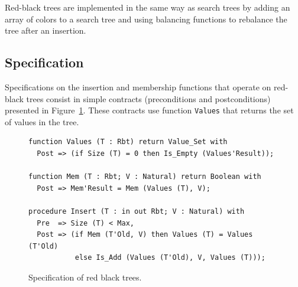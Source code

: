\documentclass{llncs}
\begin{document}
Red-black trees are implemented in the same way as search trees by adding an
array of colors to a search tree and using balancing functions to rebalance the
tree after an insertion.

\subsection{Specification}

Specifications on the insertion and membership functions that operate on
red-black trees consist in simple contracts (preconditions and postconditions)
presented in Figure~\ref{fig-rbt-spec}. These contracts use function
\texttt{Values} that returns the set of values in the tree.


\begin{figure}[ht]
\begin{small}
\begin{lstlisting}
function Values (T : Rbt) return Value_Set with
  Post => (if Size (T) = 0 then Is_Empty (Values'Result));

function Mem (T : Rbt; V : Natural) return Boolean with
  Post => Mem'Result = Mem (Values (T), V);

procedure Insert (T : in out Rbt; V : Natural) with
  Pre  => Size (T) < Max,
  Post => (if Mem (T'Old, V) then Values (T) = Values (T'Old)
           else Is_Add (Values (T'Old), V, Values (T)));
\end{lstlisting}
\end{small}
\caption{\label{fig-rbt-spec} Specification of red black trees.}
\end{figure}
\end{document}
